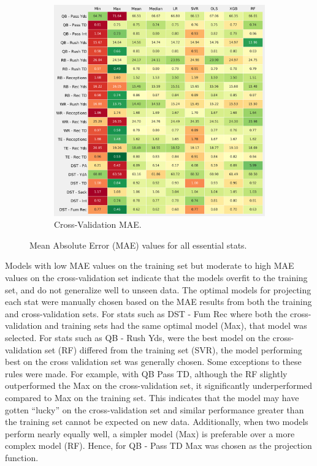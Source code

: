 \documentclass[12pt]{article}
\begin{document}
\begin{figure}[H]
\begin{subfigure}[b]{0.490\textwidth}
    \includegraphics[width=1\textwidth]{../figures/essential_cv_MAE_table}
    \caption{Cross-Validation MAE.}
  \end{subfigure}
  \caption{Mean Absolute Error (MAE) values for all essential stats.}
  \label{train/cv MAE}
\end{figure}

Models with low MAE values on the training set but moderate to high MAE values on the cross-validation set indicate that the models overfit to the training set, and do not generalize well to unseen data. The optimal models for projecting each stat were manually chosen based on the MAE results from both the training and cross-validation sets. For stats such as DST - Fum Rec where both the cross-validation and training sets had the same optimal model (Max), that model was selected. For stats such as QB - Rush Yds, were the best model on the cross-validation set (RF) differed from the training set (SVR), the model performing best on the cross validation set was generally chosen. Some exceptions to these rules were made. For example, with QB Pass TD, although the RF slightly outperformed the Max on the cross-validation set, it significantly underperformed compared to Max on the training set. This indicates that the model may have gotten ``lucky'' on the cross-validation set and similar performance greater than the training set cannot be expected on new data. Additionally, when two models perform nearly equally well, a simpler model (Max) is preferable over a more complex model (RF). Hence, for QB - Pass TD Max was chosen as the projection function.\bigskip
\end{document}

